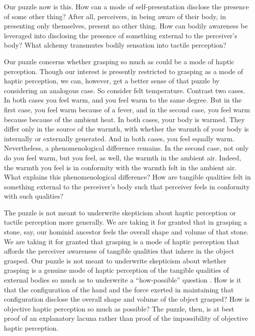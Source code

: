 Our puzzle now is this. How can a mode of self-presentation disclose the presence of some other thing? After all, perceivers, in being aware of their body, in presenting only themselves, present no other thing. How can bodily awareness be leveraged into disclosing the presence of something external to the perceiver's body? What alchemy transmutes bodily sensation into tactile perception?

Our puzzle concerns whether grasping so much as could be a mode of haptic perception. Though our interest is presently restricted to grasping as a mode of haptic perception, we can, however, get a better sense of that puzzle by considering an analogous case. So consider felt temperature. Contrast two cases. In both cases you feel warm, and you feel warm to the same degree. But in the first case, you feel warm because of a fever, and in the second case, you feel warm because because of the ambient heat. In both cases, your body is warmed. They differ only in the source of the warmth, with whether the warmth of your body is internally or externally generated. And in both cases, you feel equally warm. Nevertheless, a phenomenological difference remains. In the second case, not only do you feel warm, but you feel, as well, the warmth in the ambient air. Indeed, the warmth you feel is in conformity with the warmth felt in the ambient air. What explains this phenomenological difference? How are tangible qualities felt in something external to the perceiver's body such that perceiver feels in conformity with such qualities?

The puzzle is not meant to underwrite skepticism about haptic perception or tactile perception more generally. We are taking it for granted that in grasping a stone, say, our hominid ancestor feels the overall shape and volume of that stone. We are taking it for granted that grasping is a mode of haptic perception that affords the perceiver awareness of tangible qualities that inhere in the object grasped. Our puzzle is not meant to underwrite skepticism about whether grasping is a genuine mode of haptic perception of the tangible qualities of external bodies so much as to underwrite a ``how-possible'' question \citep{Cassam:2007lq}. How is it that the configuration of the hand and the force exerted in maintaining that configuration disclose the overall shape and volume of the object grasped? How is objective haptic perception so much as possible? The puzzle, then, is at best proof of an explanatory lacuna rather than proof of the impossibility of objective haptic perception.

